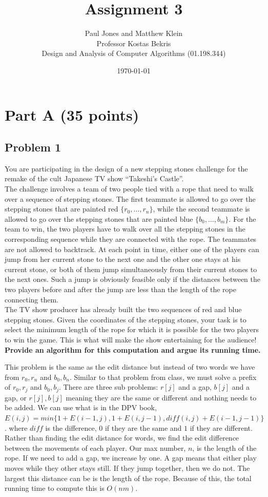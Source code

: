 \documentclass[11pt]{article}
\title{Assignment 3}
\author{Paul Jones and Matthew Klein \\
		Professor Kostas Bekris\\
		Design and Analysis of Computer Algorithms (01.198.344)}
\date{\today}
\begin{document}
\pagebreak

\section*{Part A (35 points)}

\subsection*{Problem 1} You are participating in the design of a
new stepping stones challenge for the remake of the cult Japanese TV
show ``Takeshi's Castle''.\\

\noindent The challenge involves a team of two people tied with a rope
that need to walk over a sequence of stepping stones. The first
teammate is allowed to go over the stepping stones that are painted
red $\{r_0, \ldots, r_n\}$, while the second teammate is allowed to go
over the stepping stones that are painted blue $\{b_0, \ldots,
b_m\}$. For the team to win, the two players have to walk over all the
stepping stones in the corresponding sequence while they are connected
with the rope. The teammates are not allowed to backtrack. At each
point in time, either one of the players can jump from her current
stone to the next one and the other one stays at his current stone, or
both of them jump simultaneously from their current stones to the next
ones. Such a jump is obviously feasible only if the distances between
the two players before and after the jump are less than the length of
the rope connecting them.\\

\noindent The TV show producer has already built the two sequences of
red and blue stepping stones. Given the coordinates of the stepping
stones, your task is to select the minimum length of the rope for
which it is possible for the two players to win the game. This is what
will make the show entertaining for the audience!\\

\noindent \textbf{Provide an algorithm for this computation and argue its
running time.}


This problem is the same as the edit distance but instead of two words we have from $r_0,r_n$ and $b_0,b_n$. Similar to that problem from class, we must solve a prefix of $r_0,r_j$ and $b_0,b_j$. There are three sub problems: $r[j]$ and a gap, $b[j]$ and a gap, or $r[j],b[j]$ meaning they are the same or different and nothing needs to be added. We can use what is in the DPV book, $E(i,j) = min\{1+E(i-1,j), 1+E(i,j-1), diff(i,j)+E(i-1,j-1)\}$. where $diff$ is the difference, $0$ if they are the same and $1$ if they are different. Rather than finding the edit distance for words, we find the edit difference between the movements of each player. Our max number, $n$, is the length of the rope. If we need to add a gap, we increase by one. A gap means that either play moves while they other stays still. If they jump together, then we do not. The largest this distance can be is the length of the rope. Because of this, the total running time to compute this is $O(nm)$.
\end{document}
